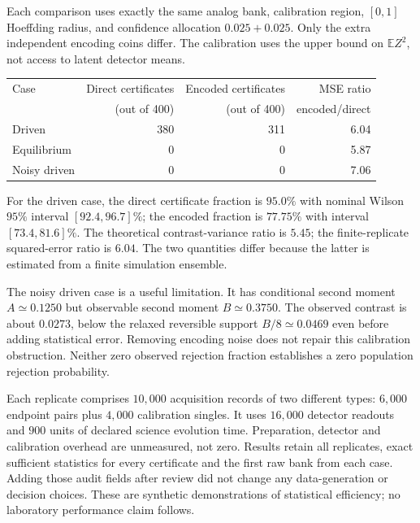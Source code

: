 Each comparison uses exactly the same analog bank, calibration region, $[0,1]$
Hoeffding radius, and confidence allocation $0.025+0.025$. Only the extra
independent encoding coins differ. The calibration uses the upper bound on
$\mathbb E Z^2$, not access to latent detector means.
\begin{center}
\begin{tabular}{lrrr}
\hline
Case & Direct certificates & Encoded certificates & MSE ratio\\
 & (out of 400) & (out of 400) & encoded/direct\\
\hline
Driven & 380 & 311 & 6.04\\
Equilibrium & 0 & 0 & 5.87\\
Noisy driven & 0 & 0 & 7.06\\
\hline
\end{tabular}
\end{center}
For the driven case, the direct certificate fraction is $95.0\%$ with nominal
Wilson $95\%$ interval $[92.4,96.7]\%$; the encoded fraction is $77.75\%$ with
interval $[73.4,81.6]\%$. The theoretical contrast-variance ratio is $5.45$;
the finite-replicate squared-error ratio is $6.04$. The two quantities differ
because the latter is estimated from a finite simulation ensemble.

The noisy driven case is a useful limitation. It has conditional second moment
$A\simeq0.1250$ but observable second moment $B\simeq0.3750$. The observed
contrast is about $0.0273$, below the relaxed reversible support $B/8\simeq
0.0469$ even before adding statistical error. Removing encoding noise does not
repair this calibration obstruction. Neither zero observed rejection fraction
establishes a zero population rejection probability.

Each replicate comprises $10{,}000$ acquisition records of two different types:
$6{,}000$ endpoint pairs plus $4{,}000$ calibration singles. It uses $16{,}000$
detector readouts and $900$ units of declared science evolution time. Preparation,
detector and calibration overhead are unmeasured, not zero. Results retain all
replicates, exact sufficient statistics for every certificate and the first raw
bank from each case. Adding those audit fields after review did not change any
data-generation or decision choices. These are synthetic demonstrations of
statistical efficiency; no laboratory performance claim follows.
